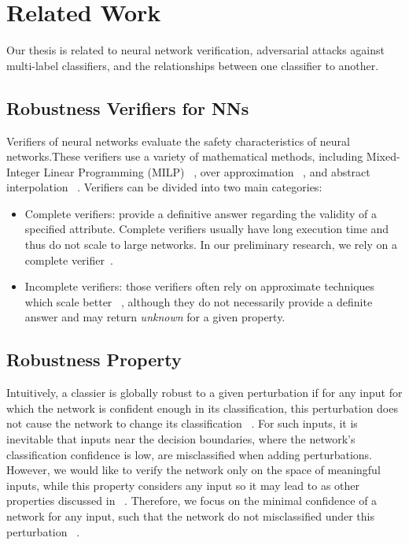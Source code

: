 
\section{Related Work}
Our thesis is related to neural network verification, adversarial attacks against multi-label classifiers, and the relationships between one classifier to another.

\subsection{Robustness Verifiers for NNs}\label{subsec:verifiers}
Verifiers of neural networks evaluate the safety characteristics of neural networks.These verifiers use a variety of mathematical methods, including Mixed-Integer Linear Programming (MILP) ~\cite{singh2018robustness,lazarus2022mixed}, over approximation ~\cite{qin2019verification}, and abstract interpolation ~\cite{ABSTRACTINTER,INCOMPLETE1}. Verifiers can be divided into two main categories:
\begin{itemize}
    \item  Complete verifiers: provide a definitive answer regarding the validity of a specified attribute.
    Complete verifiers usually have long execution time and thus do not scale to large networks.
        In our preliminary research, we rely on a complete verifier~\cite{MIPVERIFY}.
    \item Incomplete verifiers: those verifiers often rely on approximate techniques which scale better ~\cite{INCOMPLETE1,INCOMPLETE2}, although they do not necessarily provide a definite answer and may return \emph{unknown} for a given property. 
\end{itemize}

\subsection{Robustness Property}
Intuitively, a classier is globally robust to a given perturbation if for any input for which the network is confident enough in its classification, this perturbation does not cause the network to change its classification ~\cite{GLOBALROBUSNN}. For such inputs, it is inevitable that inputs near the decision boundaries, where the network’s classification confidence is low, are misclassified when adding perturbations. However, we would like to verify the network only on the space of meaningful inputs, while this property considers any input so it may lead to as other properties discussed in ~\cite{Reluplex,EFCIENTGLOBALROBU}. Therefore, we focus on the minimal confidence of a network for any input, such that the network do not misclassified under this perturbation ~\cite{VHAGAR}.
     
